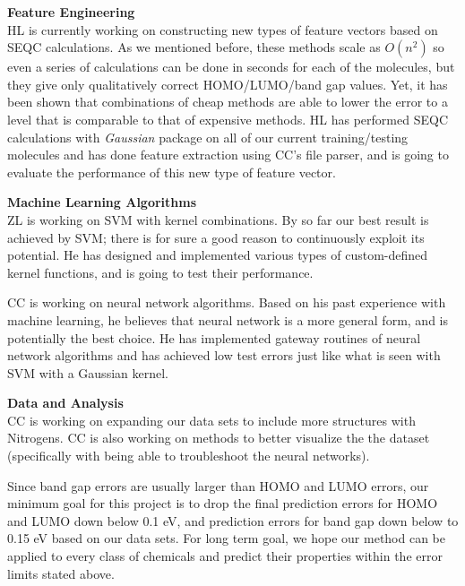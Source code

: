 \documentclass[12pt, oneside]{article}   	%
\begin{document}

\textbf{Feature Engineering} \\
HL is currently working on constructing new types of feature vectors based on SEQC calculations. As we mentioned before, these methods scale as $O(n^2)$ so even a series of calculations can be done in seconds for each of the molecules, but they give only qualitatively correct HOMO/LUMO/band gap values. Yet, it has been shown that combinations of cheap methods are able to lower the error to a level that is comparable to that of expensive methods\cite{hc}. HL has performed SEQC calculations with \textit{Gaussian} package on all of our current training/testing molecules and has done feature extraction using CC's file parser, and is going to evaluate the performance of this new type of feature vector.

\textbf{Machine Learning Algorithms} \\
ZL is working on SVM with kernel combinations. By so far our best result is achieved by SVM; there is for sure a good reason to continuously exploit its potential. He has designed and implemented various types of custom-defined kernel functions, and is going to test their performance.

CC is working on neural network algorithms. Based on his past experience with machine learning, he believes that neural network is a more general form, and is potentially the best choice. He has implemented gateway routines of neural network algorithms and has achieved low test errors just like what is seen with SVM with a Gaussian kernel.

\textbf{Data and Analysis} \\
CC is working on expanding our data sets to include more structures with Nitrogens. CC is also working on methods to better visualize the the dataset (specifically with being able to troubleshoot the neural networks).



Since band gap errors are usually larger than HOMO and LUMO errors, our minimum goal for this project is to drop the final prediction errors for HOMO and LUMO down below 0.1 eV, and prediction errors for band gap down below to 0.15 eV based on our data sets. For long term goal, we hope our method can be applied to every class of chemicals and predict their properties within the error limits stated above.

\nocite{Hansen}

\end{document}
